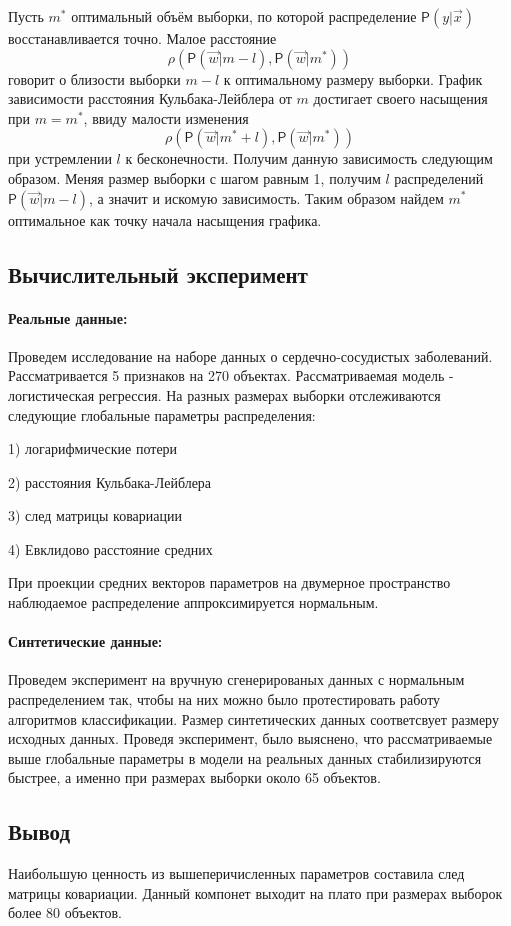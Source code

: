 \documentclass[12pt,twoside]{article}
\begin{document}
Пусть $m^*$ оптимальный объём выборки, по которой распределение $\mathsf{P}(y|\vec{x})$ восстанавливается точно. Малое расстояние $$\rho (\mathsf{P}(\vec{w}|m-l), \mathsf{P}(\vec{w}|m^*))$$ говорит о близости выборки $m-l$ к оптимальному размеру выборки. График зависимости расстояния Кульбака-Лейблера от $m$ достигает своего насыщения при $m = m^*$, ввиду малости изменения $$\rho (\mathsf{P}(\vec{w}|m^* + l), \mathsf{P}(\vec{w}|m^*))$$ при устремлении $l$ к бесконечности. Получим данную зависимость следующим образом. Меняя размер выборки с шагом равным 1, получим $l$ распределений $\mathsf{P}(\vec{w}|m-l)$, а значит и искомую зависимость. Таким образом найдем $m^*$ оптимальное как точку начала насыщения графика.

\subsection{}
\subsection{Вычислительный эксперимент}
\paragraph{Реальные данные:}
Проведем исследование на наборе данных о сердечно-сосудистых заболеваний. Рассматривается 5 признаков на 270 объектах. Рассматриваемая модель - логистическая регрессия. На разных размерах выборки отслеживаются следующие глобальные параметры распределения:

1) логарифмические потери

2) расстояния Кульбака-Лейблера

3) след матрицы ковариации

4) Евклидово расстояние средних

При проекции средних векторов параметров на двумерное пространство наблюдаемое распределение аппроксимируется нормальным.
\paragraph{Синтетические данные:}
Проведем эксперимент на вручную сгенерированых данных с нормальным распределением так, чтобы на них можно было протестировать работу алгоритмов классификации.
Размер синтетических данных соответсвует размеру исходных данных. Проведя эксперимент, было выяснено, что рассматриваемые выше глобальные параметры в модели на реальных данных стабилизируются быстрее, а именно при размерах выборки около 65 объектов. 
\subsection{}
\subsection{Вывод}
Наибольшую ценность из вышеперичисленных параметров составила след матрицы ковариации. Данный компонет выходит на плато при размерах выборок более 80 объектов.
\subsection{}
\nocite{*}


\end{document}
